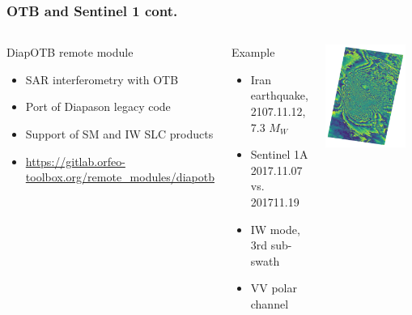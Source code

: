 \documentclass[8pt,aspectratio=169]{beamer}
\begin{document}
    \begin{frame}
    \frametitle{OTB and Sentinel 1 cont.}

    \begin{columns}
    \begin{block}{DiapOTB remote module}
      \begin{itemize}
      \item SAR interferometry with OTB
      \item Port of Diapason legacy code
      \item Support of SM and IW SLC products
      \item \small{\url{https://gitlab.orfeo-toolbox.org/remote_modules/diapotb}}
      \end{itemize}
    \end{block}
    \begin{block}{Example}
      \begin{itemize}
      \item Iran earthquake, 2107.11.12, 7.3 $M_{W}$
      \item Sentinel 1A 2017.11.07 vs. 201711.19
      \item IW mode, 3rd sub-swath
      \item VV polar channel
      \end{itemize}
      \end{block}
    \includegraphics[width=0.9\textwidth]{diapotb_output.png}
    \end{columns}
    \end{frame}
    
\end{document}
